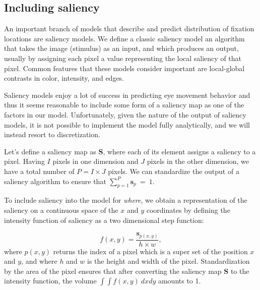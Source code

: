 \documentclass{article}
\begin{document}



\subsection{Including saliency}

An important branch of models that describe and predict distribution of fixation locations are saliency models. We define a classic saliency model an algorithm that takes the image (stimulus) as an input, and which produces an output, usually by assigning each pixel a value representing the local saliency of that pixel. Common features that these models consider important are local-global contrasts in color, intensity, and edges.

Saliency models enjoy a lot of success in predicting eye movement behavior and thus it seems reasonable to include some form of a saliency map as one of the factors in our model. Unfortunately, given the nature of the output of saliency models, it is not possible to implement the model fully analytically, and we will instead resort to discretization.

Let's define a saliency map as $\mathbf{S}$, where each of its element assigns a saliency to a pixel. Having $I$ pixels in one dimension and $J$ pixels in the other dimension, we have a total number of $P = I \times J$ pixels. We can standardize the output of a saliency algorithm to ensure that $\sum_{p=1}^{P} \mathbf{s}_{p}~=~1$.

To include saliency into the model for \textit{where}, we obtain a representation of the saliency on a continuous space of the $x$ and $y$ coordinates by defining the intensity function of saliency as a two dimensional step function: 

\begin{equation}
\label{eq:saliency_where}
    f(x, y) = \frac{\mathbf{s}_{p(x,y)} }{h \times w},
\end{equation}
where $p(x, y)$ returns the index of a pixel which is a super set of the position $x$ and $y$, and where $h$ and $w$ is the height and width of the pixel. Standardization by the area of the pixel ensures that after converting the saliency map $\mathbf{S}$ to the intensity function, the volume $\int \int f(x, y)~dxdy$ amounts to 1.
\end{document}
